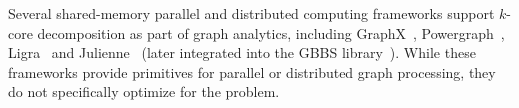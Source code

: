 {Several shared-memory parallel and distributed computing frameworks support $k$-core decomposition as part of graph analytics,
including GraphX~\cite{gonzalez2014graphx}, Powergraph~\cite{gonzalez2012powergraph}, Ligra~\cite{shun2013ligra} and Julienne~\cite{dhulipala2017} (later integrated into the GBBS library~\cite{gbbs2021}).
While these frameworks provide primitives for parallel or distributed graph processing, 
they do not specifically optimize for the \kcore{} problem.
} 